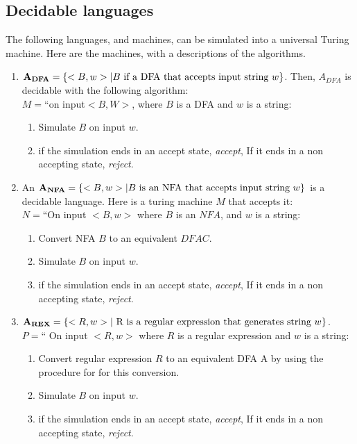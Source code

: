 \documentclass[a4paper]{article}
\begin{document}
\subsection{Decidable languages} %
\label{sub:Decidable languages}
The following languages, and machines, can be simulated into a universal Turing machine. Here are the machines, with a descriptions of the algorithms.
\begin{enumerate}[{\bf (a)}]
  \item ${\bf A_{DFA}}=\left\{ <B,w> | B \text{ if a DFA that accepts input string }w \right\}$. Then, $A_{DFA}$ is decidable with the following algorithm:\\
    $M=$``on input$<B,W>$, where $B$ is a DFA and $w$ is a string:
      \begin{enumerate}[1.]
        \item Simulate $B$ on input $w$.
        \item if the simulation ends in an accept state, \emph{accept}, If it ends in a non accepting state, \emph{reject}.
      \end{enumerate}

    \item An  ${\bf A_{NFA}}=\left\{ <B,w>| B \text{ is an NFA that accepts input string }w \right\}$ is a decidable language. Here is a turing machine $M$ that accepts it:\\
      $N=$``On input $<B,w>$ where $B$ is an $NFA$, and $w$ is a string:
      \begin{enumerate}[1.]
        \item Convert NFA $B$ to an equivalent $DFA C$. 
        \item Simulate $B$ on input $w$.
        \item if the simulation ends in an accept state, \emph{accept}, If it ends in a non accepting state, \emph{reject}.
      \end{enumerate}

    \item ${\bf A_{REX}}=\left\{ <R,w>| \text{ R is a regular expression that generates string }w \right\}$.\\
      $P=$`` On input $<R,w>$ where $R$ is a regular expression and $w$ is a string:
      \begin{enumerate} [1.]
        \item Convert regular expression $R$ to an equivalent DFA A by using the procedure for for this conversion.
        \item Simulate $B$ on input $w$.
        \item if the simulation ends in an accept state, \emph{accept}, If it ends in a non accepting state, \emph{reject}.
      \end{enumerate}


\end{enumerate}
\end{document}
